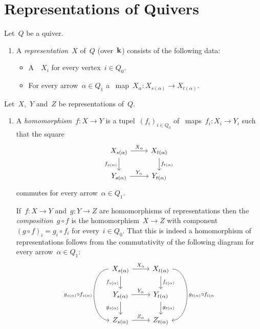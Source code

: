 \section{Representations of Quivers}


\begin{remarkdefinition}
  Let~$Q$ be a quiver.
  \begin{enumerate}
    \item
      A \emph{representation}~$X$ of~$Q$ (over~$\kf$) consists of the following data:
      \begin{itemize}
        \item
          A~{\module{$\kf$}}~$X_i$ for every vertex~$i \in Q_0$.
        \item
          For every arrow~$\alpha \in Q_1$ a~{\klin} map~$X_\alpha \colon X_{s(\alpha)} \to X_{t(\alpha)}$.
      \end{itemize}
  \end{enumerate}
  Let~$X$,~$Y$ and~$Z$ be representations of~$Q$.
  \begin{enumerate}[resume]
    \item
      A \emph{homomorphism}~$f \colon X \to Y$ is a tupel~$(f_i)_{i \in Q_0}$ of~{\klin} maps~$f_i \colon X_i \to Y_i$ such that the square
      \[
        \begin{tikzcd}
            X_{s(\alpha)}
            \arrow{r}[above]{X_\alpha}
            \arrow{d}[left]{f_{s(\alpha)}}
          & X_{t(\alpha)}
            \arrow{d}[right]{f_{t(\alpha)}}
          \\
            Y_{s(\alpha)}
            \arrow{r}[above]{Y_\alpha}
          & Y_{t(\alpha)}
        \end{tikzcd}
      \]
      commutes for every arrow~$\alpha \in Q_1$.
      
      If~$f \colon X \to Y$ and~$g \colon Y \to Z$ are homomorphisms of representations then the \emph{composition}~$g \circ f$ is the homomorphism~$X \to Z$ with component~$(g \circ f)_i = g_i \circ f_i$ for every~$i \in Q_0$.
      That this is indeed a homomorphism of representations follows from the commutativity of the following diagram for every arrow~$\alpha \in Q_1$:
      \[
        \begin{tikzcd}
            X_{s(\alpha)}
            \arrow{r}[above]{X_\alpha}
            \arrow{d}[left]{f_{s(\alpha)}}
            \arrow[bend right = 90]{dd}[left]{g_{s(\alpha)} \circ f_{s(\alpha)}}
          & X_{t(\alpha)}
            \arrow{d}[right]{f_{t(\alpha)}}
            \arrow[bend left = 90]{dd}[right]{g_{t(\alpha)} \circ f_{t(\alpha}}
          \\
            Y_{s(\alpha)}
            \arrow{r}[above]{Y_\alpha}
            \arrow{d}[left]{g_{s(\alpha)}}
          & Y_{t(\alpha)}
            \arrow{d}[right]{g_{t(\alpha)}}
          \\
            Z_{s(\alpha)}
            \arrow{r}[above]{Z_\alpha}
          & Z_{t(\alpha)}
        \end{tikzcd}
      \]
      

\end{enumerate}
\end{remarkdefinition}

